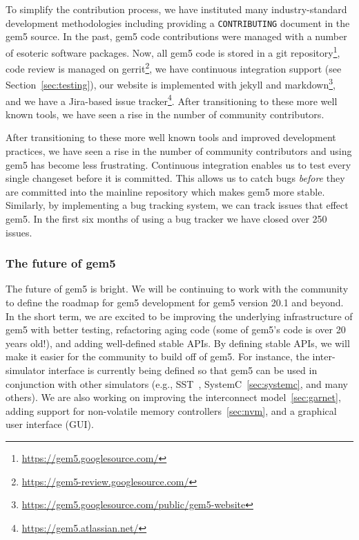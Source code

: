 To simplify the contribution process, we have instituted many industry-standard development methodologies including providing a \verb|CONTRIBUTING| document in the gem5 source.
In the past, gem5 code contributions were managed with a number of esoteric software packages.
Now, all gem5 code is stored in a git repository\footnote{\url{https://gem5.googlesource.com/}}, code review is managed on gerrit\footnote{\url{https://gem5-review.googlesource.com/}}, we have continuous integration support (see Section~\ref{sec:testing}), our website is implemented with jekyll and markdown\footnote{\url{https://gem5.googlesource.com/public/gem5-website}}, and we have a Jira-based issue tracker\footnote{\url{https://gem5.atlassian.net/}}.
After transitioning to these more well known tools, we have seen a rise in the number of community contributors.

After transitioning to these more well known tools and improved development practices, we have seen a rise in the number of community contributors and using gem5 has become less frustrating.
Continuous integration enables us to test every single changeset before it is committed.
This allows us to catch bugs \emph{before} they are committed into the mainline repository which makes gem5 more stable.
Similarly, by implementing a bug tracking system, we can track issues that effect gem5.
In the first six months of using a bug tracker we have closed over 250 issues.

\subsubsection*{The future of gem5}
The future of gem5 is bright.
We will be continuing to work with the community to define the roadmap for gem5 development for gem5 version 20.1 and beyond.
In the short term, we are excited to be improving the underlying infrastructure of gem5 with better testing, refactoring aging code (some of gem5's code is over 20 years old!), and adding well-defined stable APIs.
By defining stable APIs, we will make it easier for the community to build off of gem5.
For instance, the inter-simulator interface is currently being defined so that gem5 can be used in conjunction with other simulators (e.g., SST~\cite{}, SystemC~\ref{sec:systemc}, and many others).
We are also working on improving the interconnect model~\ref{sec:garnet}, adding support for non-volatile memory controllers~\ref{sec:nvm}, and a graphical user interface (GUI).

